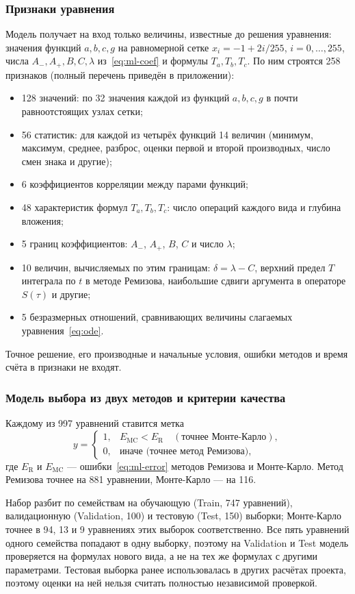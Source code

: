 \documentclass[14pt,a4paper]{extarticle}
\begin{document}
\subsubsection{Признаки уравнения}
Модель получает на вход только величины, известные до решения
уравнения: значения функций $a,b,c,g$ на равномерной сетке
$x_i=-1+2i/255$, $i=0,\dots,255$, числа $A_-,A_+,B,C,\lambda$
из~\eqref{eq:ml-coef} и формулы $T_a,T_b,T_c$. По ним строятся
258 признаков (полный перечень приведён в приложении):
\begin{itemize}
\item 128 значений: по 32 значения каждой из функций $a,b,c,g$
в почти равноотстоящих узлах сетки;
\item 56 статистик: для каждой из четырёх функций 14 величин
(минимум, максимум, среднее, разброс, оценки первой и второй
производных, число смен знака и другие);
\item 6 коэффициентов корреляции между парами функций;
\item 48 характеристик формул $T_a,T_b,T_c$: число операций каждого вида
и глубина вложения;
\item 5 границ коэффициентов: $A_-$, $A_+$, $B$, $C$ и число $\lambda$;
\item 10 величин, вычисляемых по этим границам: $\delta=\lambda-C$,
верхний предел $T$ интеграла по $t$ в методе Ремизова, наибольшие сдвиги
аргумента в операторе $S(\tau)$ и другие;
\item 5 безразмерных отношений, сравнивающих величины слагаемых
уравнения~\eqref{eq:ode}.
\end{itemize}
Точное решение, его производные и начальные условия, ошибки методов
и время счёта в признаки не входят.

\subsubsection{Модель выбора из двух методов и критерии качества}
Каждому из 997 уравнений ставится метка
\[
y=\begin{cases}
1, & E_{\mathrm{MC}}<E_{\mathrm{R}}\quad(\text{точнее Монте-Карло}),\\
0, & \text{иначе (точнее метод Ремизова)},
\end{cases}
\]
где $E_{\mathrm{R}}$ и $E_{\mathrm{MC}}$ --- ошибки~\eqref{eq:ml-error}
методов Ремизова и Монте-Карло. Метод Ремизова точнее на 881 уравнении,
Монте-Карло --- на 116.

Набор разбит по семействам на обучающую (Train, 747 уравнений),
валидационную (Validation, 100) и тестовую (Test, 150) выборки;
Монте-Карло точнее в 94, 13 и 9 уравнениях этих выборок соответственно.
Все пять уравнений одного семейства попадают в одну выборку, поэтому
на Validation и Test модель проверяется на формулах нового вида,
а не на тех же формулах с другими параметрами. Тестовая выборка ранее
использовалась в других расчётах проекта, поэтому оценки на ней нельзя
считать полностью независимой проверкой.
\end{document}

